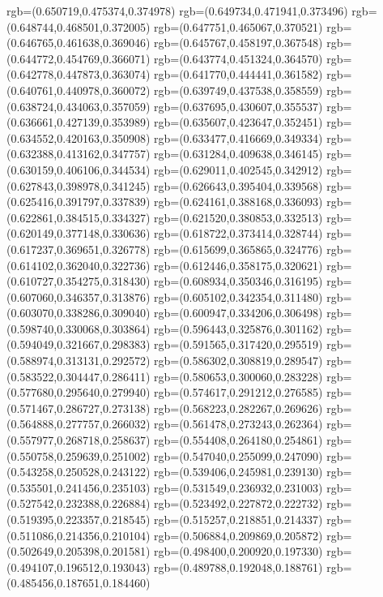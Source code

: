 {{{			rgb=(0.650719,0.475374,0.374978)
			rgb=(0.649734,0.471941,0.373496)
			rgb=(0.648744,0.468501,0.372005)
			rgb=(0.647751,0.465067,0.370521)
			rgb=(0.646765,0.461638,0.369046)
			rgb=(0.645767,0.458197,0.367548)
			rgb=(0.644772,0.454769,0.366071)
			rgb=(0.643774,0.451324,0.364570)
			rgb=(0.642778,0.447873,0.363074)
			rgb=(0.641770,0.444441,0.361582)
			rgb=(0.640761,0.440978,0.360072)
			rgb=(0.639749,0.437538,0.358559)
			rgb=(0.638724,0.434063,0.357059)
			rgb=(0.637695,0.430607,0.355537)
			rgb=(0.636661,0.427139,0.353989)
			rgb=(0.635607,0.423647,0.352451)
			rgb=(0.634552,0.420163,0.350908)
			rgb=(0.633477,0.416669,0.349334)
			rgb=(0.632388,0.413162,0.347757)
			rgb=(0.631284,0.409638,0.346145)
			rgb=(0.630159,0.406106,0.344534)
			rgb=(0.629011,0.402545,0.342912)
			rgb=(0.627843,0.398978,0.341245)
			rgb=(0.626643,0.395404,0.339568)
			rgb=(0.625416,0.391797,0.337839)
			rgb=(0.624161,0.388168,0.336093)
			rgb=(0.622861,0.384515,0.334327)
			rgb=(0.621520,0.380853,0.332513)
			rgb=(0.620149,0.377148,0.330636)
			rgb=(0.618722,0.373414,0.328744)
			rgb=(0.617237,0.369651,0.326778)
			rgb=(0.615699,0.365865,0.324776)
			rgb=(0.614102,0.362040,0.322736)
			rgb=(0.612446,0.358175,0.320621)
			rgb=(0.610727,0.354275,0.318430)
			rgb=(0.608934,0.350346,0.316195)
			rgb=(0.607060,0.346357,0.313876)
			rgb=(0.605102,0.342354,0.311480)
			rgb=(0.603070,0.338286,0.309040)
			rgb=(0.600947,0.334206,0.306498)
			rgb=(0.598740,0.330068,0.303864)
			rgb=(0.596443,0.325876,0.301162)
			rgb=(0.594049,0.321667,0.298383)
			rgb=(0.591565,0.317420,0.295519)
			rgb=(0.588974,0.313131,0.292572)
			rgb=(0.586302,0.308819,0.289547)
			rgb=(0.583522,0.304447,0.286411)
			rgb=(0.580653,0.300060,0.283228)
			rgb=(0.577680,0.295640,0.279940)
			rgb=(0.574617,0.291212,0.276585)
			rgb=(0.571467,0.286727,0.273138)
			rgb=(0.568223,0.282267,0.269626)
			rgb=(0.564888,0.277757,0.266032)
			rgb=(0.561478,0.273243,0.262364)
			rgb=(0.557977,0.268718,0.258637)
			rgb=(0.554408,0.264180,0.254861)
			rgb=(0.550758,0.259639,0.251002)
			rgb=(0.547040,0.255099,0.247090)
			rgb=(0.543258,0.250528,0.243122)
			rgb=(0.539406,0.245981,0.239130)
			rgb=(0.535501,0.241456,0.235103)
			rgb=(0.531549,0.236932,0.231003)
			rgb=(0.527542,0.232388,0.226884)
			rgb=(0.523492,0.227872,0.222732)
			rgb=(0.519395,0.223357,0.218545)
			rgb=(0.515257,0.218851,0.214337)
			rgb=(0.511086,0.214356,0.210104)
			rgb=(0.506884,0.209869,0.205872)
			rgb=(0.502649,0.205398,0.201581)
			rgb=(0.498400,0.200920,0.197330)
			rgb=(0.494107,0.196512,0.193043)
			rgb=(0.489788,0.192048,0.188761)
			rgb=(0.485456,0.187651,0.184460)
}}}

